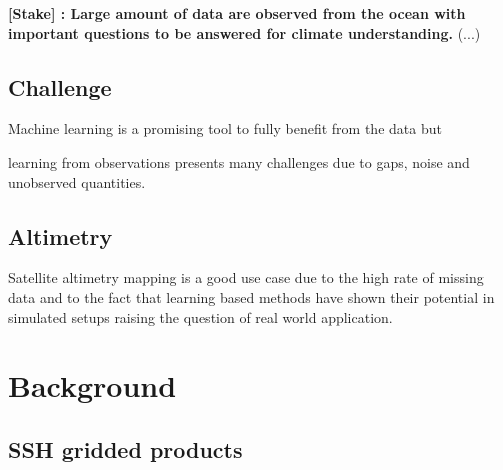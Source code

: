 \documentclass[draft]{agujournal2019}
\begin{document}






\textbf{[Stake] : Large amount of data are observed from the ocean with important questions to be answered for climate understanding.} (...)

\subsection{Challenge}
Machine learning is a promising tool to fully benefit from the data but 


learning from observations presents many challenges due to gaps, noise and unobserved quantities. 

\subsection{Altimetry}
Satellite altimetry mapping is a good use case due to the high rate of missing data and to the fact that learning based methods have shown their potential in simulated setups raising the question of real world application.


\section{Background}

\subsection{SSH gridded products}





\end{document}
